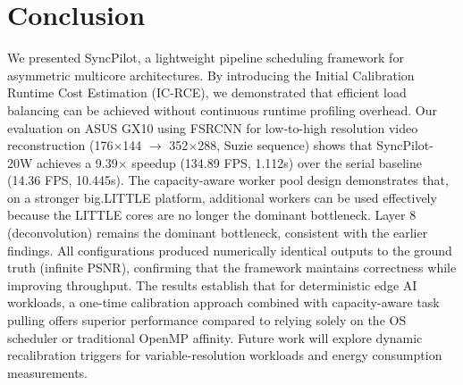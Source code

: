 \documentclass[runningheads]{llncs}
\begin{document}
\section{Conclusion}
We presented SyncPilot, a lightweight pipeline scheduling framework for asymmetric multicore architectures. By introducing the Initial Calibration Runtime Cost Estimation (IC-RCE), we demonstrated that efficient load balancing can be achieved without continuous runtime profiling overhead. Our evaluation on ASUS GX10 using FSRCNN for low-to-high resolution video reconstruction (176$\times$144 $\rightarrow$ 352$\times$288, Suzie sequence) shows that SyncPilot-20W achieves a 9.39$\times$ speedup (134.89 FPS, 1.112s) over the serial baseline (14.36 FPS, 10.445s). The capacity-aware worker pool design demonstrates that, on a stronger big.LITTLE platform, additional workers can be used effectively because the LITTLE cores are no longer the dominant bottleneck. Layer 8 (deconvolution) remains the dominant bottleneck, consistent with the earlier findings. All configurations produced numerically identical outputs to the ground truth (infinite PSNR), confirming that the framework maintains correctness while improving throughput. The results establish that for deterministic edge AI workloads, a one-time calibration approach combined with capacity-aware task pulling offers superior performance compared to relying solely on the OS scheduler or traditional OpenMP affinity. Future work will explore dynamic recalibration triggers for variable-resolution workloads and energy consumption measurements.
\end{document}
